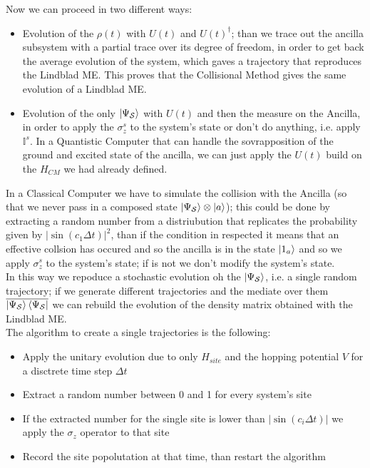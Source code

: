 \documentclass[a4paper,12pt]{article}
\begin{document}
	Now we can proceed in two different ways:
	\begin{itemize}
		\item Evolution of the $ \rho (t) $ with $ U(t) $ and $ U(t)^{\dagger} $; than we trace out the ancilla subsystem with a partial trace over its degree of freedom, in order to get back the average evolution of the system, which gaves a trajectory that reproduces the Lindblad ME. This proves that the Collisional Method gives the same evolution of a Lindblad ME.
		\item Evolution of the only $ \ket{\Psi_{\mathcal{S}}} $ with $ U(t) $ and then the measure on the Ancilla, in order to apply the $ \sigma_z^s $ to the system's state or don't do anything, i.e. apply $ \mathbb{I}^s $. In a Quantistic Computer that can handle the sovrapposition of the ground and excited state of the ancilla, we can just apply the $  U(t) $ build on the $ H_{CM} $ we had already defined.
	\end{itemize}

	In a Classical Computer we have to simulate the collision with the Ancilla (so that we never pass in a composed state $ \ket{\Psi_{\mathcal{S}}} \otimes \ket{a} $); this could be done by extracting a random number from a distriubution that replicates the probability given by $ \left| \sin{(c_1 \Delta t)} \right|^2 $, than if the condition in respected it means that an effective collsion has occured and so the ancilla is in the state $ \ket{1_a} $ and so we apply $ \sigma_z^s $ to the system's state; if is not we don't modify the system's state. \\
	In this way we repoduce a stochastic evolution oh the $ \ket{\Psi_{\mathcal{S}}} $, i.e. a single random trajectory; if we generate different trajectories and the mediate over them $ \overline{\ket{\Psi_{\mathcal{S}}} \bra{\Psi_{\mathcal{S}}}} $ we can rebuild the evolution of the density matrix obtained with the Lindblad ME. \\
	The algorithm to create a single trajectories is the following:
	\begin{itemize}
		\item [1.] Apply the unitary evolution due to only $ H_{site} $ and the hopping potential $ V $ for a disctrete time step $ \Delta t $
		\item[2.] Extract a random number between 0 and 1 for every system's site
		\item[3.] If the extracted number for the single site is lower than $ \left| \sin{(c_i \Delta t)} \right| $ we apply the $ \sigma_z $ operator to that site
		\item[4.] Record the site popolutation at that time, than restart the algorithm
	\end{itemize}
\end{document}
